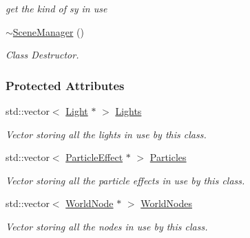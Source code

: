 \begin{DoxyCompactItemize}
\begin{DoxyCompactList}\small\item\em get the kind of sy in use \item\end{DoxyCompactList}\item 
\hyperlink{classphys_1_1SceneManager_a5076643eec92dc0c9c9ccb7ac2225cde}{$\sim$SceneManager} ()
\begin{DoxyCompactList}\small\item\em Class Destructor. \item\end{DoxyCompactList}\end{DoxyCompactItemize}
\subsubsection*{Protected Attributes}
\begin{DoxyCompactItemize}
\item 
\hypertarget{classphys_1_1SceneManager_a196c70361e8db0d5861cfb7b35f1bbf3}{
std::vector$<$ \hyperlink{classphys_1_1Light}{Light} $\ast$ $>$ \hyperlink{classphys_1_1SceneManager_a196c70361e8db0d5861cfb7b35f1bbf3}{Lights}}
\label{classphys_1_1SceneManager_a196c70361e8db0d5861cfb7b35f1bbf3}

\begin{DoxyCompactList}\small\item\em Vector storing all the lights in use by this class. \item\end{DoxyCompactList}\item 
\hypertarget{classphys_1_1SceneManager_a45f2d2029642d668c1e15a914eac7d1b}{
std::vector$<$ \hyperlink{classphys_1_1ParticleEffect}{ParticleEffect} $\ast$ $>$ \hyperlink{classphys_1_1SceneManager_a45f2d2029642d668c1e15a914eac7d1b}{Particles}}
\label{classphys_1_1SceneManager_a45f2d2029642d668c1e15a914eac7d1b}

\begin{DoxyCompactList}\small\item\em Vector storing all the particle effects in use by this class. \item\end{DoxyCompactList}\item 
\hypertarget{classphys_1_1SceneManager_a51a391281cc074801792599ae38638b0}{
std::vector$<$ \hyperlink{classphys_1_1WorldNode}{WorldNode} $\ast$ $>$ \hyperlink{classphys_1_1SceneManager_a51a391281cc074801792599ae38638b0}{WorldNodes}}
\label{classphys_1_1SceneManager_a51a391281cc074801792599ae38638b0}

\begin{DoxyCompactList}\small\item\em Vector storing all the nodes in use by this class. \item\end{DoxyCompactList}\end{DoxyCompactItemize}


